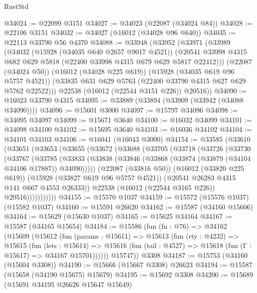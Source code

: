 \begin{lexlean}{RustStd}
\begin{coremodule}
@34024 := @22099 @3151
@34027 := @34023 (@22087 (@34024 @84))
@34028 := @22106 @3151
@34032 := @34027 (@16012 (@34028 @96 @640))
@34035 := @22113 @33790 @56 @4370
@34088 := @33948
    (@33952
      (@33971
        (@33989
          (@34032
            (@15928 (@34035 @640 @2657 @9017 @4521))
            (@20541 @33998 @4315 @682 @629 @5818 (@22400 @33998 @4315 @679 @629 @5817 @22412)))
          (@22087 (@34024 @50))
          (@16012 (@34028 @225 @619))
          (@15928 (@34035 @619 @96 @5757 @4521))
          (@33835 @631 @629 @5763 (@22400 @33790 @4315 @627 @629 @5762 @22522)))
        @22538
        (@16012 (@22544 @3151 @226))
        @20516))
@34090 := @16023 @33790 @4315
@34095 := @33889 (@33894 (@33909 (@33942 (@34088 @34090))))
@34096 := @15601 @3000
@34097 := @15797 @34096
@34098 := @34095 @34097
@34099 := @15671 @3640
@34100 := @16032 @34099
@34101 := @34098 @34100
@34102 := @15695 @3640
@34103 := @16036 @34102
@34104 := @34101 @34103
@34106 := @16041 (@16043 @3000)
@34154 := @33585
    (@33610
      (@33651
        (@33653
          (@33655
            (@33672
              (@33688
                (@33705
                  (@33718
                    (@33726
                      (@33730
                        (@33767
                          (@33785
                            (@33833
                              (@33838
                                (@33846 (@33868 (@33874 (@33879 (@34104 @34106 @17887)) @34090)))))
                            (@22087 (@33816 @50))
                            (@16012 (@33820 @225 @619))
                            (@15928 (@33827 @619 @96 @5757 @4521))
                            (@20541 @26283 @4315 @141 @667 @4553 @26333))
                          @22538
                          (@16012 (@22544 @3165 @226))
                          @20516)))))))))))
@34155 := @15570 @1037
@34159 := @15572 (@15576 @1037) (@15582 @1037)
@34160 := @15591 @26620
@34162 := @15587 (@34160 @15606)
@34164 := @15629 (@15630 @1037)
@34165 := @15625 @34164
@34167 := @15587 (@34165 @15654)
@34184 := @15586
    (fun (fn : @76) =>
    @34162
      (@15609
        (@15612
          (fun (params : @15611) =>
          @15613
            (fun (rty : @4232) =>
            @15615
              (fun (lets : @15614) =>
              @15616 (fun (tail : @4527) => @15618 (fun (Γ : @15617) => @34167 @15701))))))
        @15747))
    @3308
@34187 := @15753 (@34160 (@15604 @3308))
@34190 := @15666 (@15667 @3308) @26623
@34194 := @15587 (@15658 (@34190 @15675) @15679)
@34195 := @15692 @3308
@34200 := @15689 (@15691 @34195 @26626 @15647 @15649)

\end{coremodule}
\end{lexlean}
